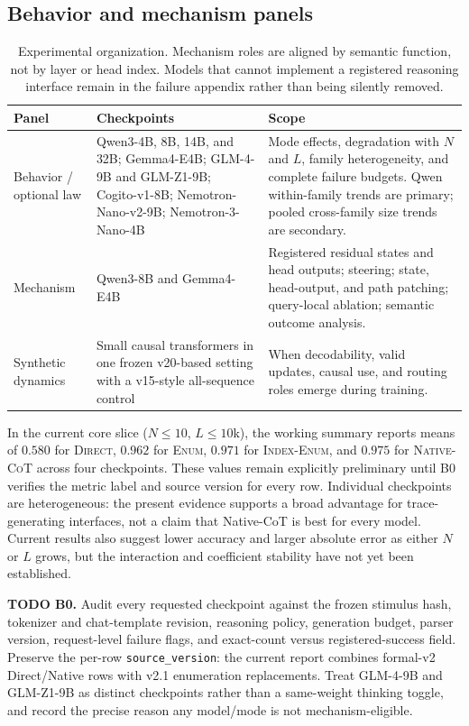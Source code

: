 \documentclass[10pt,twocolumn]{article}
\newcommand{\todoid}[2]{%
  \par\noindent\textcolor{red!75!black}{\textbf{TODO #1.} #2}\par}
\newcommand{\direct}{\textsc{Direct}\xspace}
\newcommand{\enumplain}{\textsc{Enum}\xspace}
\newcommand{\enumindex}{\textsc{Index-Enum}\xspace}
\newcommand{\native}{\textsc{Native-CoT}\xspace}
\begin{document}
\subsection{Behavior and mechanism panels}
\begin{table}[t]
\centering
\small
\begin{tabularx}{\textwidth}{p{}X X}
\toprule
Panel & Checkpoints & Scope \\
\midrule
Behavior / optional law &
Qwen3-4B, 8B, 14B, and 32B; Gemma4-E4B; GLM-4-9B and GLM-Z1-9B;
Cogito-v1-8B; Nemotron-Nano-v2-9B; Nemotron-3-Nano-4B &
Mode effects, degradation with $N$ and $L$, family heterogeneity, and complete failure budgets.
Qwen within-family trends are primary; pooled cross-family size trends are secondary. \\
Mechanism &
Qwen3-8B and Gemma4-E4B &
Registered residual states and head outputs; steering; state, head-output, and path patching;
query-local ablation; semantic outcome analysis. \\
Synthetic dynamics &
Small causal transformers in one frozen v20-based setting with a v15-style all-sequence control &
When decodability, valid updates, causal use, and routing roles emerge during training. \\
\bottomrule
\end{tabularx}
\caption{Experimental organization. Mechanism roles are aligned by semantic function, not by
layer or head index. Models that cannot implement a registered reasoning interface remain in
the failure appendix rather than being silently removed.}
\label{tab:model-scope}
\end{table}

In the current core slice ($N\leq10$, $L\leq10$k), the working summary reports means of
$0.580$ for \direct, $0.962$ for \enumplain, $0.971$ for \enumindex, and $0.975$ for \native
across four checkpoints. These values remain explicitly preliminary until \textsc{B0} verifies
the metric label and source version for every row. Individual checkpoints are heterogeneous:
the present evidence supports a broad advantage for trace-generating interfaces, not a claim
that Native-CoT is best for every model. Current results also suggest lower accuracy and larger
absolute error as either $N$ or $L$ grows, but the interaction and coefficient stability have
not yet been established.

\todoid{B0}{Audit every requested checkpoint against the frozen stimulus hash, tokenizer and
chat-template revision, reasoning policy, generation budget, parser version, request-level
failure flags, and exact-count versus registered-success field. Preserve the per-row
\texttt{source\_version}: the current report combines formal-v2 Direct/Native rows with v2.1
enumeration replacements. Treat GLM-4-9B and GLM-Z1-9B as distinct checkpoints rather than a
same-weight thinking toggle, and record the precise reason any model/mode is not
mechanism-eligible.}
\end{document}
